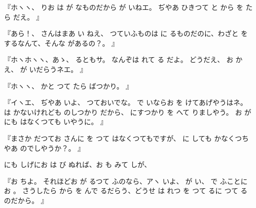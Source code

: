 『ホヽヽ、
りお
は
が
なものだから
が
いねエ。
ぢやあ
ひきつて
と
から
を
たら
だえ。
』

『あら！、
さんはまあ
い
ねえ、
つていふものは
に
るものだのに、わざと
をするなんて、そんな
があるの？。
』

『ホヽホヽヽ、あゝ、
るともサ。
なんぞは
れて
る
だよ。
どうだえ、
お
かえ、
が
いだらうネエ。
』

『ホヽヽ、
かと
つて
たら
ばつかり。
』

『イヽエ、
ぢやあ
いよ、
つておいでな。
で
いならお
を
けてあげやうはネ。
は
かないけれども
のしつかり
だから、
にすつかり
を
へて
りましやう。
お
が
にも
はなくつても
いやうに。
』

『まさか
だつてお
さんに
を
つて
はなくつてもですが、
に
しても
かなくつちやあ
のでしやうか？。
』

にも
しげにお
は
び
ぬれば、お
も
みて
しが、

『お
ちよ。
それほどお
が
るつて
ふのなら、アヽ
いよ、
が
い、
で
ふことにお
。
さうしたら
から
を
んで
るだらう、どうせ
は
れつ
を
つて
るに
つて
るのだから。
』


